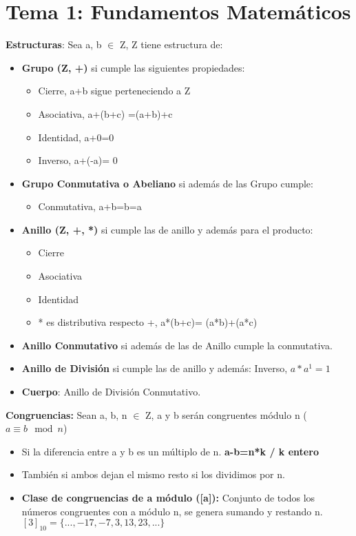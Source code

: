 \documentclass[12pt, twoside, openright]{report} %
\begin{document}
\chapter{Tema 1: Fundamentos Matemáticos}
\textbf{Estructuras}: Sea a, b $\in$ Z, Z tiene estructura de:
\begin{itemize}
	\item \textbf{Grupo (Z, +)} si cumple las siguientes propiedades:
	      \begin{itemize}
		      \item Cierre, a+b sigue perteneciendo a Z
		      \item Asociativa, a+(b+c) =(a+b)+c
		      \item Identidad, a+0=0
		      \item Inverso, a+(-a)= 0
	      \end{itemize}
	\item \textbf{Grupo Conmutativa o Abeliano} si además de las Grupo cumple:
	      \begin{itemize}
		      \item Conmutativa, a+b=b=a
	      \end{itemize}
	\item \textbf{Anillo (Z, +, *)} si cumple las de anillo y además para el producto:
	      \begin{itemize}
		      \item Cierre
		      \item Asociativa
		      \item Identidad
		      \item * es distributiva respecto +, a*(b+c)= (a*b)+(a*c)
	      \end{itemize}
	\item \textbf{Anillo Conmutativo} si además de las de Anillo cumple la conmutativa.
	\item \textbf{Anillo de División} si cumple las de anillo y además: Inverso, $a*a^1=1$
	\item \textbf{Cuerpo}: Anillo de División Conmutativo.
\end{itemize}
\textbf{Congruencias:} Sean a, b, n $\in$ Z, a y b serán congruentes módulo n ($a \equiv b  \mod n$)
\begin{itemize}
	\item Si la diferencia entre a y b es un múltiplo de n. \textbf{a-b=n*k / k entero}
	\item También si ambos dejan el mismo resto si los dividimos por n.
	\item \textbf{Clase de congruencias de a módulo ([a]):} Conjunto de todos los números congruentes con a módulo n, se genera sumando y restando n. $[3]_{10}=\{..., -17, -7, 3, 13, 23,...\}$
\end{itemize}
\end{document}
